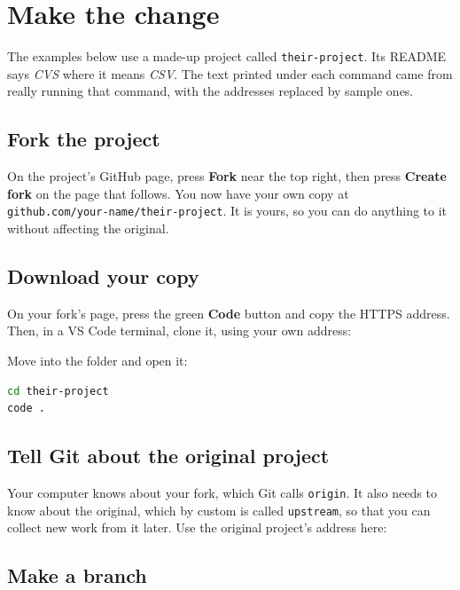 \chapter{Make the change}
\label{ch:change}

The examples below use a made-up project called \texttt{their-project}. Its README says \emph{CVS} where it means \emph{CSV}. The text printed under each command came from really running that command, with the addresses replaced by sample ones.

\section{Fork the project}

On the project's GitHub page, press \textbf{Fork} near the top right, then press \textbf{Create fork} on the page that follows. You now have your own copy at \texttt{github.com/your-name/their-project}. It is yours, so you can do anything to it without affecting the original.


\section{Download your copy}

On your fork's page, press the green \textbf{Code} button and copy the HTTPS address. Then, in a VS Code terminal, clone it, using your own address:



Move into the folder and open it:

\begin{lstlisting}[language=bash]
cd their-project
code .
\end{lstlisting}

\section{Tell Git about the original project}

Your computer knows about your fork, which Git calls \texttt{origin}. It also needs to know about the original, which by custom is called \texttt{upstream}, so that you can collect new work from it later. Use the original project's address here:



\section{Make a branch}

